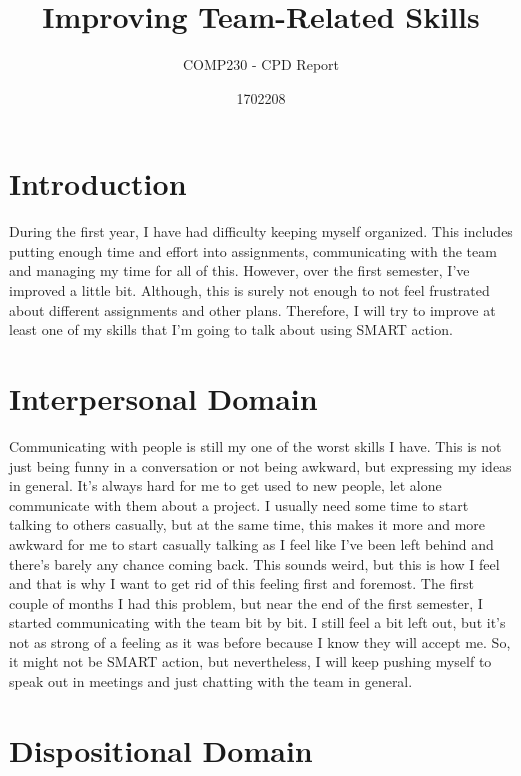 \documentclass{scrartcl}
\title{Improving Team-Related Skills}
\subtitle{COMP230 - CPD Report}
\author{1702208}
\begin{document}
\maketitle

\section{Introduction}

During the first year, I have had difficulty keeping myself organized. This includes putting enough time and effort into assignments, communicating with the team and managing my time for all of this. However, over the first semester, I've improved a little bit. Although, this is surely not enough to not feel frustrated about different assignments and other plans. Therefore, I will try to improve at least one of my skills that I'm going to talk about using SMART action.

\section{Interpersonal Domain}

Communicating with people is still my one of the worst skills I have. This is not just being funny in a conversation or not being awkward, but expressing my ideas in general. It's always hard for me to get used to new people, let alone communicate with them about a project. I usually need some time to start talking to others casually, but at the same time, this makes it more and more awkward for me to start casually talking as I feel like I've been left behind and there's barely any chance coming back. This sounds weird, but this is how I feel and that is why I want to get rid of this feeling first and foremost. The first couple of months I had this problem, but near the end of the first semester, I started communicating with the team bit by bit. I still feel a bit left out, but it's not as strong of a feeling as it was before because I know they will accept me. So, it might not be SMART action, but nevertheless, I will keep pushing myself to speak out in meetings and just chatting with the team in general.

\section{Dispositional Domain}
\end{document}
